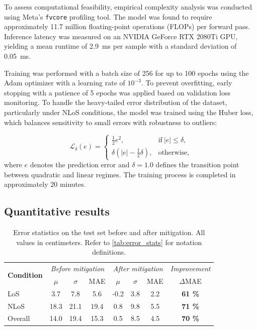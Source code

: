 To assess computational feasibility, empirical complexity analysis was conducted using Meta's \texttt{fvcore} profiling tool. The model was found to require approximately 11.7 million floating-point operations (FLOPs) per forward pass. Inference latency was measured on an NVIDIA GeForce RTX 2080Ti GPU, yielding a mean runtime of \SI{2.9}{\milli\second} per sample with a standard deviation of \SI{0.05}{\milli\second}.

Training was performed with a batch size of 256 for up to 100 epochs using the Adam optimizer with a learning rate of $10^{-3}$. To prevent overfitting, early stopping with a patience of 5 epochs was applied based on validation loss monitoring. To handle the heavy-tailed error distribution of the dataset, particularly under NLoS conditions, the model was trained using the Huber loss, which balances sensitivity to small errors with robustness to outliers:

\begin{equation} 
\mathcal{L}_{\delta}(e) = 
\begin{cases} 
\frac{1}{2}e^2, & \text{if}\ |e| \leq \delta,\\
\delta \left(|e| - \frac{1}{2}\delta\right), & \text{otherwise}, 
\end{cases} 
\end{equation}
where $e$ denotes the prediction error and $\delta = 1.0$ defines the transition point between quadratic and linear regimes. The training process is completed in approximately 20 minutes.

\subsection{Quantitative results}

\begin{table}[tbh] 
\centering 
\caption[Error statistics before and after mitigation.]{Error statistics on the test set before and after mitigation. All values in centimeters. Refer to \autoref{tab:error_stats} for notation definitions.} 
\label{tab:test_results} 
\begin{tabular}{lccc|ccc|c} 
\toprule 
\multirow{2}{*}{\textbf{Condition}} 
& \multicolumn{3}{c|}{\textit{Before mitigation}} 
& \multicolumn{3}{c|}{\textit{After mitigation}} 
& \textit{Improvement} \\
& $\mu$ & $\sigma$ & MAE & $\mu$ & $\sigma$ & MAE & $\Delta$MAE \\
\midrule 
LoS     & 3.7  & 7.8  & 5.6  & -0.2 & 3.8 & 2.2 & \textbf{61 \%} \\
NLoS    & 18.3 & 21.1 & 19.4 & 0.8  & 9.8 & 5.5 & \textbf{71 \%} \\
Overall & 14.0 & 19.4 & 15.3 & 0.5  & 8.5 & 4.5 & \textbf{70 \%} \\
\bottomrule 
\end{tabular} 
\end{table}

